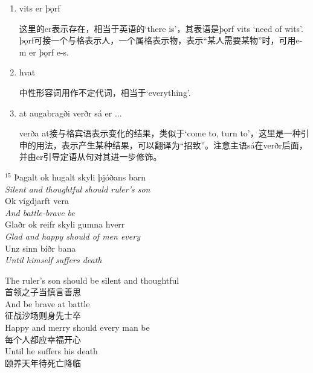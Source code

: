 \begin{grammar*}{}
    \begin{enumerate}[leftmargin=*]
        \item vits er þǫrf

              这里的er表示存在，相当于英语的`there is'，其表语是þǫrf vits `need of wits'. þǫrf可接一个与格表示人，一个属格表示物，表示“某人需要某物”时，可用e-m er þǫrf e-s.

        \item hvat

              中性形容词用作不定代词，相当于`everything'.

        \item at augabragði verðr sá er ...

              verða at接与格宾语表示变化的结果，类似于`come to, turn to'，这里是一种引申的用法，表示产生某种结果，可以翻译为“招致”。注意主语sá在verðr后面，并由er引导定语从句对其进一步修饰。
    \end{enumerate}
\end{grammar*}
\medskip %
\begin{paracol}{2}
    \noindent
    $^{15}$ Þagalt ok hugalt skyli þjóðans barn\\
    \textit{Silent and thoughtful should ruler's son }\\
    Ok vígdjarft vera\\
    \textit{And battle-brave be}\\
    Glaðr ok reifr skyli gumna hverr\\
    \textit{Glad and happy should of men every}\\
    Unz sinn bíðr bana\\
    \textit{Until himself suffers death}\\
    \switchcolumn

    \noindent
    The ruler's son should be silent and thoughtful\\
    首领之子当慎言善思\\
    And be brave at battle\\
    征战沙场则身先士卒\\
    Happy and merry should every man be\\
    每个人都应幸福开心\\
    Until he suffers his death\\
    颐养天年待死亡降临\\

\end{paracol}
